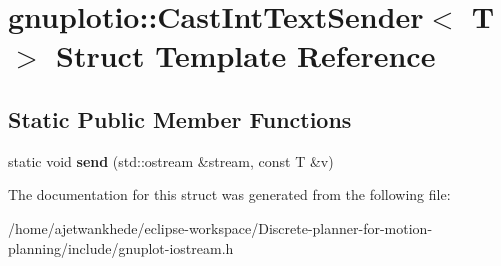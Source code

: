 \hypertarget{structgnuplotio_1_1CastIntTextSender}{}\section{gnuplotio\+:\+:Cast\+Int\+Text\+Sender$<$ T $>$ Struct Template Reference}
\label{structgnuplotio_1_1CastIntTextSender}
\subsection*{Static Public Member Functions}
\begin{DoxyCompactItemize}
\item 
\mbox{\label{structgnuplotio_1_1CastIntTextSender_a42733f83f843a375437e7e5f716ea65e}} 
static void {\bfseries send} (std\+::ostream \&stream, const T \&v)
\end{DoxyCompactItemize}


The documentation for this struct was generated from the following file\+:\begin{DoxyCompactItemize}
\item 
/home/ajetwankhede/eclipse-\/workspace/\+Discrete-\/planner-\/for-\/motion-\/planning/include/gnuplot-\/iostream.\+h\end{DoxyCompactItemize}
